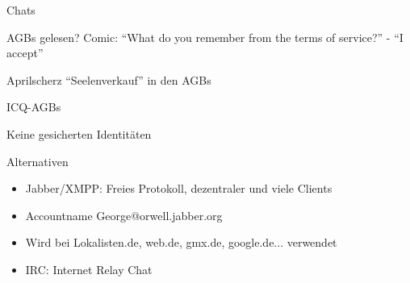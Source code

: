 \begin{frame}{Chats}
\end{frame}

\begin{frame}{AGBs gelesen?}
Comic: "`What do you remember from the terms of service?"' - "`I accept"'

Aprilscherz "`Seelenverkauf"' in den AGBs

ICQ-AGBs
\end{frame}

\begin{frame}{Keine gesicherten Identitäten}
\end{frame}

\begin{frame}{Alternativen}
	\begin{itemize}
		\item Jabber/XMPP: Freies Protokoll, dezentraler und viele Clients
		\item Accountname George@orwell.jabber.org
		\item Wird bei Lokalisten.de, web.de, gmx.de, google.de... verwendet
		\item IRC: Internet Relay Chat
	\end{itemize}
\end{frame}


